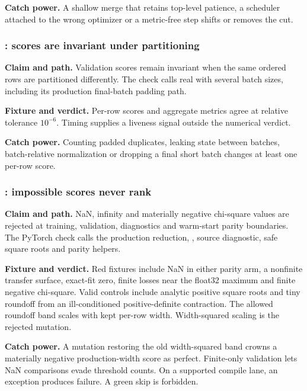 \textbf{Catch power.}  A shallow merge that retains top-level patience, a
scheduler attached to the wrong optimizer or a metric-free step shifts or
removes the cut.

\subsubsection{: scores are invariant under partitioning}

\textbf{Claim and path.}  Validation scores remain invariant when the same
ordered rows are partitioned differently.  The check calls real  with
several batch sizes, including its production final-batch padding path.

\textbf{Fixture and verdict.}  Per-row scores and aggregate metrics agree at
relative tolerance \(10^{-6}\).  Timing supplies a liveness signal outside the
numerical verdict.

\textbf{Catch power.}  Counting padded duplicates, leaking state between
batches, batch-relative normalization or dropping a final short batch
changes at least one per-row score.

\subsubsection{: impossible scores never rank}

\textbf{Claim and path.}  NaN, infinity and materially negative chi-square
values are rejected at training, validation, diagnostics and warm-start
parity boundaries.  The PyTorch check calls the production reduction,
, source diagnostic, safe square roots and parity helpers.

\textbf{Fixture and verdict.}  Red fixtures include NaN in either parity arm,
a nonfinite transfer surface, exact-fit zero, finite losses near the float32
maximum and finite negative chi-square.  Valid controls include analytic
positive square roots and tiny roundoff from an ill-conditioned
positive-definite contraction.  The allowed roundoff band scales with kept
per-row width.  Width-squared scaling is the rejected mutation.

\textbf{Catch power.}  A mutation restoring the old width-squared band crowns
a materially negative production-width score as perfect.  Finite-only
validation lets NaN comparisons evade threshold counts.  On a supported
compile lane, an exception produces failure.  A green skip is forbidden.

